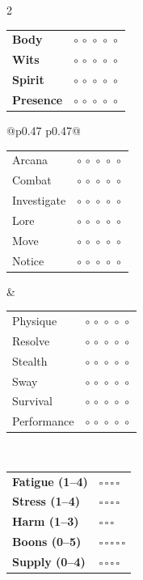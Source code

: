 \documentclass[10pt,letterpaper]{article}
\newcommand{\trackfive}{\normalsize$\circ\,\circ\,\circ\,\circ\,\circ$}
\newcommand{\trackfour}{\normalsize$\square\,\square\,\square\,\square$}
\begin{document}
\begin{paracol}{2}


\begin{tcolorbox}[sheetbox,title=\textbf{Attributes},breakable]
\small
\begin{tabularx}{\columnwidth}{@{}l r@{}}
\textbf{Body} & \trackfive \\
\textbf{Wits} & \trackfive \\
\textbf{Spirit} & \trackfive \\
\textbf{Presence} & \trackfive \\
\end{tabularx}
\end{tcolorbox}

\begin{tcolorbox}[sheetbox,title=\textbf{Skills},breakable]
\footnotesize
\begin{tabularx}{\columnwidth}{@{}p{0.47\columnwidth} p{0.47\columnwidth}@{}}
\begin{tabularx}{\linewidth}{@{}l r@{}}
Arcana & \trackfive \\
Combat & \trackfive \\
Investigate & \trackfive \\
Lore & \trackfive \\
Move & \trackfive \\
Notice & \trackfive \\
\end{tabularx}
&
\begin{tabularx}{\linewidth}{@{}l r@{}}
Physique & \trackfive \\
Resolve & \trackfive \\
Stealth & \trackfive \\
Sway & \trackfive \\
Survival & \trackfive \\
Performance & \trackfive \\
\end{tabularx}
\\
\end{tabularx}
\end{tcolorbox}

\begin{tcolorbox}[sheetbox,title=\textbf{Conditions \& Resources},breakable]
\footnotesize
\begin{tabularx}{\columnwidth}{@{}l X@{}}
\textbf{Fatigue (1--4)} & \trackfour \\
\textbf{Stress (1--4)} & \trackfour \\
\textbf{Harm (1--3)} & $\square\,\square\,\square$ \\
\textbf{Boons (0--5)} & $\square\,\square\,\square\,\square\,\square$ \\
\textbf{Supply (0--4)} & \trackfour \\
\end{tabularx}


\end{tcolorbox}
\end{paracol}
\end{document}
